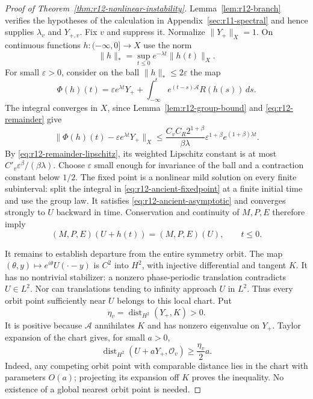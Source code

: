 \begin{proof}[Proof of Theorem~\ref{thm:r12-nonlinear-instability}]
Lemma~\ref{lem:r12-branch} verifies the hypotheses of the calculation in Appendix~\ref{sec:r11-spectral} and hence supplies $\lambda_v$ and
$Y_{+,v}$. Fix $v$ and suppress it. Normalize $\|Y_+\|_X=1$. On continuous
functions $h:(-\infty,0]\to X$ use the norm
\[
 \|h\|_* =\sup_{t\le0}e^{-\lambda t}\|h(t)\|_X.
\]
For small $\varepsilon>0$, consider on the ball $\|h\|_*\le2\varepsilon$
the map
\begin{equation}\label{eq:r12-ancient-fixedpoint}
 \Phi(h)(t)=\varepsilon e^{\lambda t}Y_+
       +\int_{-\infty}^t e^{(t-s)\mathcal A}R(h(s))\,ds.
\end{equation}
The integral converges in $X$, since Lemma~\ref{lem:r12-group-bound}
and \eqref{eq:r12-remainder} give
\begin{equation}\label{eq:r12-ancient-error}
 \|\Phi(h)(t)-\varepsilon e^{\lambda t}Y_+\|_X
 \le \frac{C_v C_R2^{1+\beta}}{\beta\lambda}
             \varepsilon^{1+\beta}e^{(1+\beta)\lambda t}.
\end{equation}
By \eqref{eq:r12-remainder-lipschitz}, its weighted Lipschitz constant
is at most $C'_v\varepsilon^\beta/(\beta\lambda)$.
Choose $\varepsilon$ small enough for invariance of the ball and a
contraction constant below $1/2$. The fixed point is a nonlinear mild
solution on every finite subinterval: split the integral in
\eqref{eq:r12-ancient-fixedpoint} at a finite initial time and use
the group law. It satisfies \eqref{eq:r12-ancient-asymptotic} and
converges strongly to $U$ backward in time. Conservation and continuity
of $M,P,E$ therefore imply
\begin{equation}\label{eq:r12-exact-invariants}
 (M,P,E)(U+h(t))=(M,P,E)(U),\qquad t\le0.
\end{equation}

It remains to establish departure from the entire symmetry orbit.
The map $(\theta,y)\mapsto e^{i\theta}U(\cdot-y)$ is $C^2$ into
$H^2$, with injective differential and tangent $K$. It has no
nontrivial stabilizer: a nonzero phase-periodic translation contradicts
$U\in L^2$. Nor can translations tending to infinity approach $U$ in
$L^2$. Thus every orbit point sufficiently near $U$ belongs to this
local chart. Put
\[
 \eta_v=\operatorname{dist}_{H^2}(Y_+,K)>0.
\]
It is positive because $\mathcal A$ annihilates $K$ and has nonzero
eigenvalue on $Y_+$. Taylor expansion of the chart gives, for small
$a>0$,
\begin{equation}\label{eq:r12-orbit-transverse}
 \operatorname{dist}_{H^2}(U+aY_+,\mathcal O_v)
                          \ge\frac{\eta_v}{2}a.
\end{equation}
Indeed, any competing orbit point with comparable distance lies in the
chart with parameters $O(a)$; projecting its expansion off $K$ proves
the inequality. No existence of a global nearest orbit point is needed.


\end{proof}
